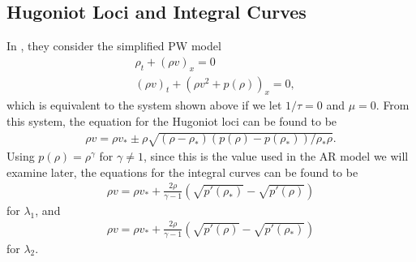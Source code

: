 \documentclass{article}
\begin{document}
\subsection{Hugoniot Loci and Integral Curves}
In \cite{AwRascle2000}, they consider the simplified PW model
\begin{align*}
&\rho_t + \left( \rho v\right)_x = 0 \\
&\left( \rho v\right)_t + \left( \rho v^2 + p(\rho )\right)_x = 0,
\end{align*}
which is equivalent to the system shown above if we let $1/\tau = 0$ and $\mu = 0$.
From this system, the equation for the Hugoniot loci can be found to be
\begin{align*}
\rho v = \rho v_* \pm \rho \sqrt{\left( \rho - \rho_*\right) \left( p(\rho ) - p(\rho_*)\right) / \rho_*\rho }.
\end{align*}
Using $p(\rho) = \rho^{\gamma}$ for $\gamma \neq 1$, since this is the value used in the AR model we will examine later, the equations for the integral curves can be found to be
\begin{align*}
\rho v = \rho v_* + \frac{2 \rho}{\gamma - 1}\left( \sqrt{p'(\rho_*)} - \sqrt{p'(\rho)}\right)
\end{align*}
for $\lambda_1$, and 
\begin{align*}
\rho v = \rho v_* + \frac{2 \rho}{\gamma - 1}\left( \sqrt{p'(\rho)} - \sqrt{p'(\rho_*)} \right)
\end{align*}
for $\lambda_2$.
\end{document}
